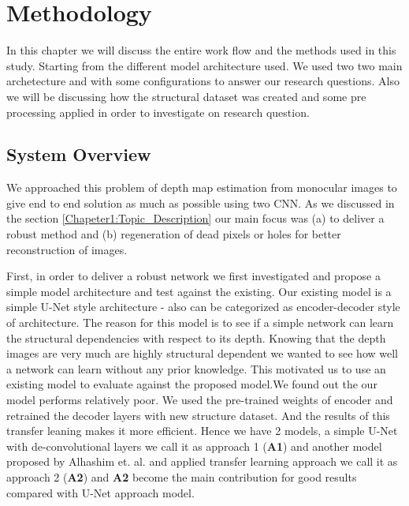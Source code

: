 
\chapter{Methodology}

\label{Chapter5:Methodology} 

In this chapter we will discuss the entire work flow and the methods used in this study. Starting from the different model architecture used. We used two two main archetecture and with some configurations to answer our research questions. Also we will be discussing how the structural dataset was created and some pre processing applied in order to investigate on research question.


\section{System Overview}
We approached this problem of depth map estimation from monocular images to give end to end solution as much as possible using two CNN. As we discussed in the section \ref{Chapeter1:Topic_Description} our main focus was (a) to deliver a robust method and (b) regeneration of dead pixels or holes for better reconstruction of images. 

First, in order to deliver a robust network we first investigated and propose a simple model architecture and test against the existing. Our existing model is a simple U-Net style architecture - also can be categorized as encoder-decoder style of architecture. The reason for this model is to see if a simple network can learn the structural dependencies with respect to its depth. Knowing that the depth images are very much are highly structural dependent we wanted to see how well a network can learn without any prior knowledge. This motivated us to use an existing model to evaluate against the proposed model.We found out the our model performs relatively poor. We used the pre-trained weights of encoder and retrained the decoder layers with new structure dataset. And the results of this transfer leaning makes it more efficient. Hence we have 2 models, a simple U-Net with de-convolutional layers we call it as approach 1  (\textbf{A1}) and another model proposed by Alhashim et. al. \cite{Alhashim2018} and applied transfer learning approach we call it as approach 2 (\textbf{A2}) and \textbf{A2} become the main contribution for good results compared with U-Net approach model. 

